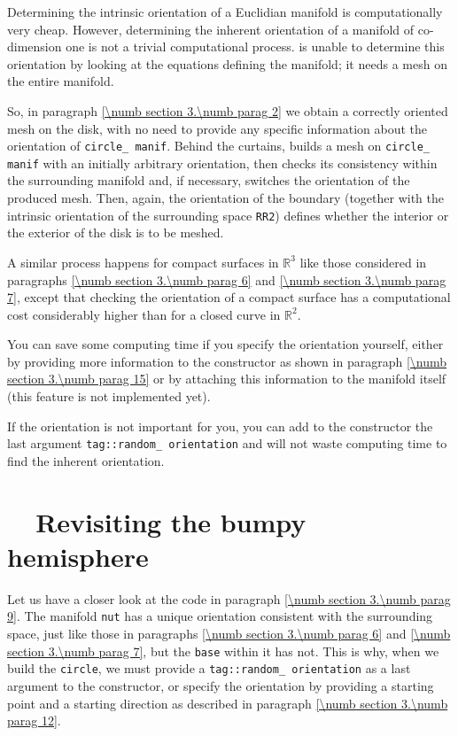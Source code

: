 Determining the intrinsic orientation of a Euclidian manifold is computationally
very cheap.
However, determining the inherent orientation of a manifold of co-dimension one is not
a trivial computational process.
{\ManiFEM} is unable to determine this orientation by looking at the equations defining
the manifold; it needs a mesh on the entire manifold.

So, in paragraph \ref{\numb section 3.\numb parag 2} we obtain a correctly oriented mesh
on the disk, with no need to provide any specific information about the orientation of
{\small\tt circle\_\,manif}.
Behind the curtains, {\maniFEM} builds a mesh on {\small\tt circle\_\,manif} with
an initially arbitrary orientation, then checks its consistency
within the surrounding manifold and, if necessary, switches the orientation of the produced mesh.
Then, again, the orientation of the boundary (together with the intrinsic orientation of
the surrounding space {\small\tt RR2}) defines whether the interior or the exterior of the
disk is to be meshed.

A similar process happens for compact surfaces in $ \mathbb{R}^3 $ like those
considered in paragraphs \ref{\numb section 3.\numb parag 6} and
\ref{\numb section 3.\numb parag 7},
except that checking the orientation of a compact surface has a computational cost
considerably higher than for a closed curve in $ \mathbb{R}^2 $.

You can save some computing time if you specify the orientation
yourself, either by providing more information to the {\small\tt {}} constructor as shown
in paragraph \ref{\numb section 3.\numb parag 15} or by attaching this information to
the manifold itself (this feature is not implemented yet).
 
If the orientation is not important for you, you can add to the {\small\tt {}} constructor
the last argument {\small\tt \textcolor{tag}{tag}::random\_\,orientation} and {\maniFEM} will not waste
computing time to find the inherent orientation.
\vskip 1mm

\section{~~Revisiting the bumpy hemisphere}\label{\numb section 3.\numb parag 14}

Let us have a closer look at the code in paragraph \ref{\numb section 3.\numb parag 9}.
The manifold {\small\tt nut} has a unique orientation consistent with the surrounding
space, just like those in paragraphs \ref{\numb section 3.\numb parag 6} and
\ref{\numb section 3.\numb parag 7}, but the {\small\tt base} within it has not.
This is why, when we build the {\small\tt circle}, we must provide a
{\small\tt \textcolor{tag}{tag}::random\_\,orientation} as a last argument to the
{\small\tt {}} constructor,
or specify the orientation by providing a starting point and a starting direction
as described in paragraph \ref{\numb section 3.\numb parag 12}.

